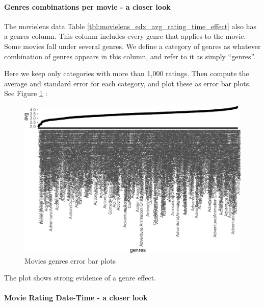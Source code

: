 \documentclass[
]{article}
\begin{document}
\newpage

\hypertarget{genres-combinations-per-movie---a-closer-look}{%
\paragraph{Genres combinations per movie - a closer
look}\label{genres-combinations-per-movie---a-closer-look}}

The movielens data Table \ref{tbl:movielens_edx_avg_rating_time_effect}
also has a genres column. This column includes every genre that applies
to the movie. Some movies fall under several genres. We define a
category of genres as whatever combination of genres appears in this
column, and refer to it as simply ``genres''.

Here we keep only categories with more than 1,000 ratings. Then compute
the average and standard error for each category, and plot these as
error bar plots. See Figure \ref{fig:genres_error_bar_plots} :

\begin{figure}
\centering
\includegraphics{figures/gnr-1.pdf}
\caption{Movies genres error bar
plots\label{fig:genres_error_bar_plots}}
\end{figure}

The plot shows strong evidence of a genre effect.

\newpage

\hypertarget{movie-rating-date-time---a-closer-look}{%
\paragraph{Movie Rating Date-Time - a closer
look}\label{movie-rating-date-time---a-closer-look}}
\end{document}
